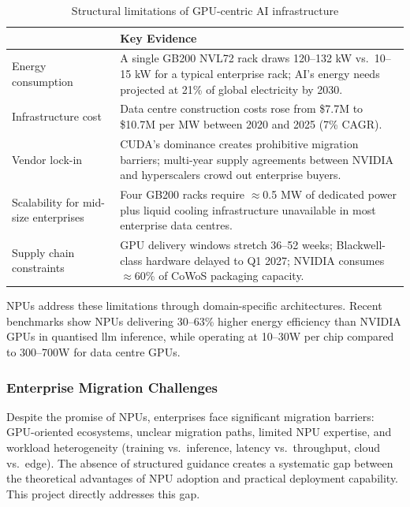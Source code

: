 \begin{table}[htbp]
  \centering
  \caption{Structural limitations of GPU-centric AI infrastructure}
  \label{tab:gpu-limitations}
  \begin{tabularx}{\textwidth}{lX}
    \toprule
    \tableheader{Limitation & Key Evidence} \\
    \midrule
    Energy consumption
      & A single GB200 NVL72 rack draws 120–132 kW vs.\ 10–15 kW for a typical
        enterprise rack; AI's energy needs projected at 21\% of global
        electricity by 2030. \\
    \rowcolor{TableRowOdd}
    Infrastructure cost
      & Data centre construction costs rose from \$7.7M to \$10.7M per MW
        between 2020 and 2025 (7\% CAGR). \\
    Vendor lock-in
      & CUDA's dominance creates prohibitive migration barriers; multi-year supply
        agreements between NVIDIA and hyperscalers crowd out enterprise buyers. \\
    \rowcolor{TableRowOdd}
    Scalability for mid-size enterprises
      & Four GB200 racks require $\approx$0.5 MW of dedicated power plus
        liquid cooling infrastructure unavailable in most enterprise data centres. \\
    Supply chain constraints
      & GPU delivery windows stretch 36–52 weeks; Blackwell-class hardware
        delayed to Q1 2027; NVIDIA consumes $\approx$60\% of CoWoS packaging
        capacity. \\
    \bottomrule
  \end{tabularx}
\end{table}

NPUs address these limitations through domain-specific architectures.
Recent benchmarks show NPUs delivering 30–63\% higher energy efficiency than
NVIDIA GPUs in quantised \acrshort{llm} inference, while operating at
10–30W per chip compared to 300–700W for data centre GPUs.

\subsubsection{Enterprise Migration Challenges}

Despite the promise of NPUs, enterprises face significant migration barriers:
GPU-oriented ecosystems, unclear migration paths, limited NPU expertise, and
workload heterogeneity (training vs.\ inference, latency vs.\ throughput, cloud
vs.\ edge). The absence of structured guidance creates a systematic gap between
the theoretical advantages of NPU adoption and practical deployment capability.
This project directly addresses this gap.

